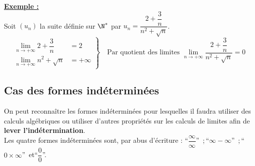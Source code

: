 \documentclass[11pt,twoside, openany]{extbook}
\begin{document}
\noindent \textbf{\ul{Exemple :}}\\
Soit $(u_n)$ la suite définie sur $\N^*$ par $u_n=\dfrac{2+\dfrac{3}{n}}{n^2+\sqrt{n}}$. 
\begin{equation*}
	\left.
	\begin{aligned}
		\lim\limits_{n \rightarrow +\infty} 2+\dfrac{3}{n} &= 2 \quad \\
		\lim\limits_{n \rightarrow +\infty}  n^2+\sqrt{n} &= +\infty 
	\end{aligned}
	\right\}
	\quad \text{Par quotient des limites $\lim\limits_{n \rightarrow +\infty} \dfrac{2+\dfrac{3}{n}}{n^2+\sqrt{n}}=0$}
\end{equation*}
\newpage
\subsection{Cas des formes indéterminées }
On peut reconnaître les formes indéterminées pour lesquelles il faudra utiliser des calculs algébriques ou utiliser d'autres propriétés sur les calculs de limites afin de \textbf{lever l'indétermination}.\\ Les quatre formes indéterminées sont, par abus d'écriture : \enquote{$\dfrac{\infty}{\infty}$} \,;\,\enquote{$\infty-\infty$} \,;\,\enquote{$0 \times \infty$} \,et\;\enquote{$\dfrac{0}{0}$}.
\end{document}
